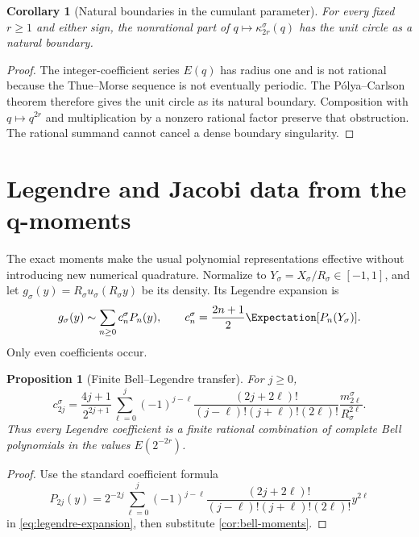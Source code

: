 \documentclass[11pt,oneside]{article}
\numberwithin{equation}{section}
\newtheorem{proposition}[theorem]{Proposition}
\newtheorem{corollary}[theorem]{Corollary}
\theoremstyle{definition}
\theoremstyle{remark}
\begin{document}
\begin{corollary}[Natural boundaries in the cumulant parameter]
\label{cor:cumulant-natural-boundary}
For every fixed $r\ge1$ and either sign, the nonrational part of
$q\mapsto\kappa_{2r}^\sigma(q)$ has the unit circle as a natural boundary.
\end{corollary}

\begin{proof}
The integer-coefficient series $E(q)$ has radius one and is not rational because the
Thue--Morse sequence is not eventually periodic.  The P\'olya--Carlson theorem
\cite{Carlson1921} therefore gives the unit circle as its natural boundary.  Composition
with $q\mapsto q^{2r}$ and multiplication by a nonzero rational factor preserve that
obstruction.  The rational summand cannot cancel a dense boundary singularity.
\end{proof}

\section{Legendre and Jacobi data from the q-moments}
\label{sec:legendre}

The exact moments make the usual polynomial representations effective without introducing
new numerical quadrature.  Normalize to $Y_\sigma=X_\sigma/R_\sigma\in[-1,1]$, and let
$g_\sigma(y)=R_\sigma u_\sigma(R_\sigma y)$ be its density.  Its Legendre expansion is
\begin{equation}
 g_\sigma(y)\sim\sum_{n\ge0}c_n^\sigma P_n(y),
 \qquad
 c_n^\sigma=\frac{2n+1}{2}\Expectation[P_n(Y_\sigma)].
 \label{eq:legendre-expansion}
\end{equation}
Only even coefficients occur.

\begin{proposition}[Finite Bell--Legendre transfer]
\label{prop:legendre-transfer}
For $j\ge0$,
\begin{equation}
 c_{2j}^\sigma
 =\frac{4j+1}{2^{2j+1}}
 \sum_{\ell=0}^j(-1)^{j-\ell}
 \frac{(2j+2\ell)!}{(j-\ell)!(j+\ell)!(2\ell)!}
 \frac{m_{2\ell}^\sigma}{R_\sigma^{2\ell}}.
 \label{eq:legendre-coeff}
\end{equation}
Thus every Legendre coefficient is a finite rational combination of complete Bell
polynomials in the values $E(2^{-2r})$.
\end{proposition}

\begin{proof}
Use the standard coefficient formula
\[
 P_{2j}(y)=2^{-2j}\sum_{\ell=0}^j(-1)^{j-\ell}
 \frac{(2j+2\ell)!}{(j-\ell)!(j+\ell)!(2\ell)!}y^{2\ell}
\]
in \eqref{eq:legendre-expansion}, then substitute \cref{cor:bell-moments}.
\end{proof}
\end{document}
